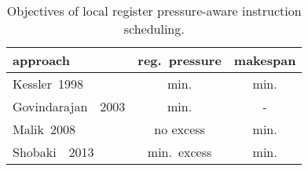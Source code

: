 \documentclass[acmsmall,authorversion,nonacm]{acmart}
\begin{document}
\begin{table}[b]\centering
  \newcommand{\minimizeGoal}{min.}
  \setlength{\tabcolsep}{3.5pt}
  \caption{Objectives of local register pressure-aware instruction scheduling.
  \label{tab:rp-vs-makespan}}
  \begin{tabu}{lcc}
    \hline \textbf{approach} & \textbf{reg.~pressure} & \textbf{makespan}\\\hline
    Kessler~1998 & \minimizeGoal{} & \minimizeGoal{}\\
    Govindarajan~\etal{}~2003 & \minimizeGoal{} & - \\
    Malik~2008 & no excess & \minimizeGoal{}\\
    Shobaki~\etal{}~2013 & min.~excess & \minimizeGoal{}\\
  \end{tabu}
\end{table}
\end{document}

